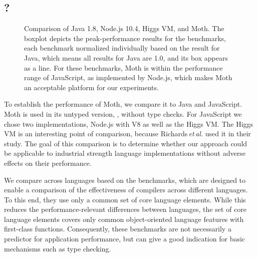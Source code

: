 \subsection{\AWFY?}
\label{sec:baseline-perf}


\begin{figure}
  \centering
	\AwfyBaseline{}
	\caption{Comparison of Java 1.8, Node.js 10.4, Higgs VM, and Moth.
  The boxplot depicts the peak-performance results for the \AWFY benchmarks,
  each benchmark normalized individually based on the result for Java,
  which means all results for Java are 1.0, and its box appears as a line.
  For these benchmarks, Moth is within the performance range
  of JavaScript, as implemented by Node.js,
  which makes Moth an acceptable platform for our experiments.}
	\label{fig:awfy-baseline}
\end{figure}

To establish the performance of Moth,
we compare it to Java and JavaScript.
Moth is used in its untyped version, \ie, without type checks.
For JavaScript we chose two implementations,
Node.js with V8 as well as the Higgs VM.
The Higgs VM is an interesting point of comparison,
because Richards\,\emph{et\,al.}\citep{Richards2017} used it in their study.
The goal of this comparison is to determine whether our approach
could be applicable to industrial strength language implementations
without adverse effects on their performance.

We compare across languages based on the \AWFY benchmarks\citep{Marr2016},
which are designed to enable a comparison
of the effectiveness of compilers across different languages.
To this end, they use only a common set of core language elements.
While this reduces the performance-relevant differences between languages,
the set of core language elements covers only common object-oriented language
features with first-class functions.
Consequently, these benchmarks are not necessarily a predictor
for application performance,
but can give a good indication for basic mechanisms such as type checking.

